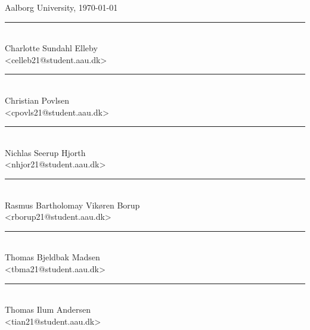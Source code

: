 \newpage

\vspace{\baselineskip}\hfill Aalborg University, \today
\vfill\noindent
\begin{minipage}[b]{0.45\textwidth}
 \centering
 \rule{\textwidth}{0.5pt}\\
  Charlotte Sundahl Elleby\\
 {\footnotesize <celleb21@student.aau.dk>}
\end{minipage}
\hfill
\begin{minipage}[b]{0.45\textwidth}
 \centering
 \rule{\textwidth}{0.5pt}\\
  Christian Povlsen\\
 {\footnotesize <cpovls21@student.aau.dk>}
\end{minipage}
\vspace{3\baselineskip}
\hfill
\vfill\noindent
\begin{minipage}[b]{0.45\textwidth}
 \centering
 \rule{\textwidth}{0.5pt}\\
  Nichlas Seerup Hjorth\\
 {\footnotesize <nhjor21@student.aau.dk>}
\end{minipage}
\hfill
\begin{minipage}[b]{0.45\textwidth}
 \centering
 \rule{\textwidth}{0.5pt}\\
  Rasmus Bartholomay Vikøren Borup\\
 {\footnotesize <rborup21@student.aau.dk>}
\end{minipage}
\vspace{3\baselineskip}
\hfill
\vfill\noindent
\begin{minipage}[b]{0.45\textwidth}
 \centering
 \rule{\textwidth}{0.5pt}\\
  Thomas Bjeldbak Madsen\\
 {\footnotesize <tbma21@student.aau.dk>}
\end{minipage}
\hfill
\begin{minipage}[b]{0.45\textwidth}
 \centering
 \rule{\textwidth}{0.5pt}\\
  Thomas Ilum Andersen\\
 {\footnotesize <tian21@student.aau.dk>}
\end{minipage}
\vspace{3\baselineskip}
\hfill


